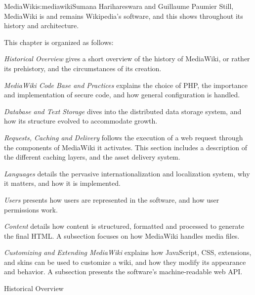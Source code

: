 \begin{aosachapter}{MediaWiki}{s:mediawiki}{Sumana Harihareswara and Guillaume Paumier}
Still, MediaWiki is and remains Wikipedia's software, and this shows
throughout its history and architecture.

\pagebreak

This chapter is organized as follows:

\begin{aosaitemize}

\item \emph{Historical Overview} gives a short overview of the history
  of MediaWiki, or rather its prehistory, and the circumstances of its
  creation.

\item \emph{MediaWiki Code Base and Practices} explains the choice of
  PHP, the importance and implementation of secure code, and how
  general configuration is handled.

\item \emph{Database and Text Storage} dives into the distributed data
  storage system, and how its structure evolved to accommodate growth.

\item \emph{Requests, Caching and Delivery} follows the execution of a
  web request through the components of MediaWiki it activates. This
  section includes a description of the different caching layers, and
  the asset delivery system.

\item \emph{Languages} details the pervasive internationalization and
  localization system, why it matters, and how it is implemented.

\item \emph{Users} presents how users are represented in the software,
  and how user permissions work.

\item \emph{Content} details how content is structured, formatted and
  processed to generate the final HTML. A subsection focuses on how
  MediaWiki handles media files.

\item \emph{Customizing and Extending MediaWiki} explains how
  JavaScript, CSS, extensions, and skins can be used to customize a
  wiki, and how they modify its appearance and behavior. A subsection
  presents the software's machine-readable web API.

\end{aosaitemize}

\begin{aosasect1}{Historical Overview}


\end{aosasect1}
\end{aosachapter}
